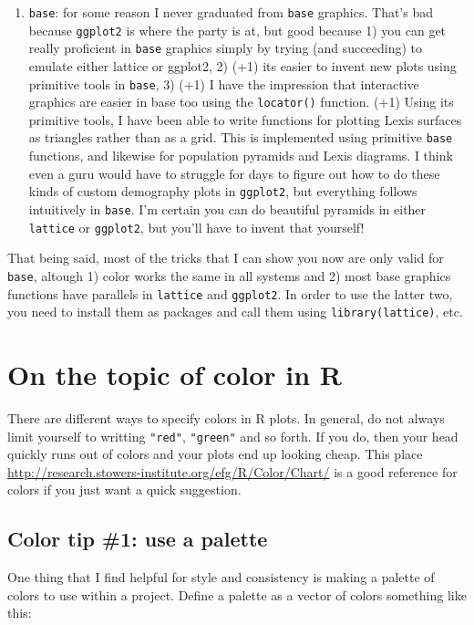 \documentclass[a4paper]{article}
\begin{document}
\begin{enumerate}
\item{\texttt{base}}: for some reason I never graduated from \texttt{base} graphics. That's bad because \texttt{ggplot2} is where the party is at, but good because 1) you can get really proficient in \texttt{base} graphics simply by trying (and succeeding) to emulate either lattice or ggplot2, 2) (+1) its easier to invent new plots using primitive tools in \texttt{base}, 3) (+1) I have the impression that interactive graphics are easier in base too using the \texttt{locator()} function. (+1) Using its primitive tools, I have been able to write functions for plotting Lexis surfaces as triangles rather than as a grid. This is implemented using primitive \texttt{base} functions, and likewise for population pyramids and Lexis diagrams. I think even a guru would have to struggle for days to figure out how to do these kinds of custom demography plots in \texttt{ggplot2}, but everything follows intuitively in \texttt{base}. I'm certain you can do beautiful pyramids in either \texttt{lattice} or \texttt{ggplot2}, but you'll have to invent that yourself!
\end{enumerate}

That being said, most of the tricks that I can show you now are only valid for \texttt{base}, altough 1) color works the same in all systems and 2) most base graphics functions have parallels in \texttt{lattice} and \texttt{ggplot2}. In order to use the latter two, you need to install them as packages and call them using \texttt{library(lattice)}, etc.
\pagebreak
\section{On the topic of color in R}
There are different ways to specify colors in R plots. In general, do not always limit yourself to writting \texttt{"red"}, \texttt{"green"} and so forth. If you do, then your head quickly runs out of colors and your plots end up looking cheap. This place \url{http://research.stowers-institute.org/efg/R/Color/Chart/} is a good reference for colors if you just want a quick suggestion. 

\subsection{Color tip \#1: use a palette}
One thing that I find helpful for style and consistency is making a palette of colors to use within a project. Define a palette as a vector of colors something like this:
\end{document}

